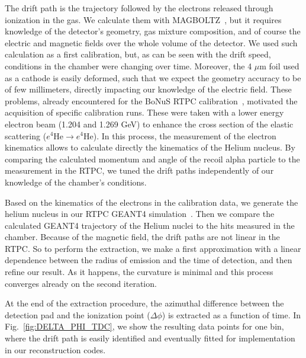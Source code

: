 \documentclass[preprint,5p]{elsarticle}
\begin{document}
The drift path is the trajectory followed by the electrons released through 
ionization in the gas. We calculate them with
MAGBOLTZ~\cite{MAGBOLTZ}, but it requires knowledge of the detector's 
geometry, gas mixture composition, and of course the electric and magnetic 
fields over the whole volume of the detector. We used such calculation as a 
first calibration, but, 
as can be seen with the drift speed, conditions in the chamber were changing 
over time. Moreover, the 4 $\mu$m foil used as a cathode is easily deformed, such
that we expect the geometry accuracy to be of few millimeters, directly impacting 
our knowledge of the electric field. These problems, already 
encountered for the BoNuS RTPC calibration~\cite{BONUS-NIM}, motivated the 
acquisition of specific calibration runs. These were taken with a lower energy 
electron beam (1.204 and 1.269 GeV) to enhance the cross section of the elastic 
scattering ($e^{4}$He$\rightarrow e^{4}$He). In this process, the measurement of
the electron kinematics allows to calculate directly the kinematics of the Helium nucleus. 
By comparing the calculated momentum and angle of the recoil alpha particle to the 
measurement in the RTPC, we tuned the drift paths independently of our 
knowledge of the chamber's conditions.

Based on the kinematics of the electrons in the calibration data, 
we generate the helium nucleus in our RTPC GEANT4 simulation~\cite{GEANT4}. Then 
we compare the calculated GEANT4 trajectory of the Helium nuclei to 
the hits measured in the chamber. 
Because of the magnetic field, the drift paths are not linear in the RTPC. So 
to perform the extraction, we make a first approximation with a linear 
dependence between the radius of emission and the time of detection, and then 
refine our result. As it happens, the curvature is minimal and this process 
converges already on the second iteration. 

At the end of the extraction procedure, the azimuthal difference between the detection pad and 
the ionization point ($\Delta\phi$) is extracted as a function of time. 
In Fig.~\ref{fig:DELTA_PHI_TDC}, we show the resulting data points for one 
bin, where the drift path is easily identified and eventually fitted for 
implementation in our reconstruction codes.
\end{document}
